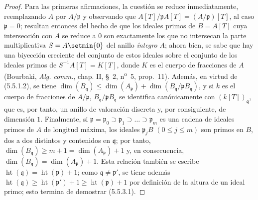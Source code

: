 \begin{proof}
Para las primeras afirmaciones, la cuestión se reduce inmediatamente, reemplazando
$A$ por $A/\mathfrak p$ y observando que
$A[T]/\mathfrak pA[T]=(A/\mathfrak p)[T]$, al caso $\mathfrak p=0$; resultan
entonces del hecho de que los ideales primos de $B=A[T]$ cuya intersección
con $A$ se reduce a $0$ son exactamente los que no intersecan la parte
multiplicativa $S=A\setmin\{0\}$ del anillo \emph{íntegro} $A$; ahora bien, se sabe que hay
una biyección creciente del conjunto de estos ideales sobre el conjunto de los
ideales primos de $S^{-1}A[T]=K[T]$, donde $K$ es el cuerpo de fracciones de
$A$ (Bourbaki, \emph{Alg. comm.}, chap. II,
\S~2, n\textsuperscript{o}~5, prop.~11). Además, en virtud de (5.5.1.2), se
tiene
$\dim(B_{\mathfrak q})\leq\dim(A_{\mathfrak p})
+\dim(B_{\mathfrak q}/\mathfrak pB_{\mathfrak q})$,
y si $k$ es el cuerpo de fracciones de $A/\mathfrak p$,
$B_{\mathfrak q}/\mathfrak pB_{\mathfrak q}$ se identifica canónicamente con
$(k[T])_{\mathfrak q}$, que es, por tanto, un anillo de valoración discreta y,
por consiguiente, de dimensión $1$. Finalmente, si
$\mathfrak p=\mathfrak p_0\supset\mathfrak p_1\supset\ldots
\supset\mathfrak p_m$ es una cadena de ideales primos de $A$ de longitud
máxima, los ideales $\mathfrak p_jB$ $(0\leq j\leq m)$ son primos en
$B$, dos a dos distintos y contenidos en $\mathfrak q$; por tanto,
$\dim(B_{\mathfrak q})\geq m+1=\dim(A_{\mathfrak p})+1$ y, en consecuencia,
$\dim(B_{\mathfrak q})=\dim(A_{\mathfrak p})+1$. Esta relación también se
escribe $\operatorname{ht}(\mathfrak q)=\operatorname{ht}(\mathfrak p)+1$;
como $\mathfrak q\ne\mathfrak p'$, se tiene además
$\operatorname{ht}(\mathfrak q)\geq\operatorname{ht}(\mathfrak p')+1
\geq\operatorname{ht}(\mathfrak p)+1$ por definición de la altura de un
ideal primo; esto termina de demostrar (5.5.3.1).
\end{proof}
